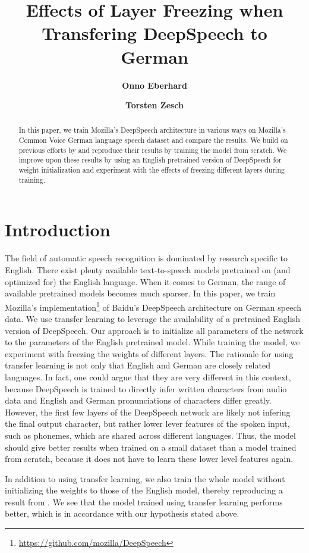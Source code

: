 \documentclass[12pt]{article}    %
\title{Effects of Layer Freezing when Transfering DeepSpeech to German}
\author[1]{\textbf{Onno Eberhard}}
\author[ ]{\textbf{Torsten Zesch}}
\affil[ ]{Language Technology Lab}
\affil[ ]{University of Duisburg-Essen}
\affil[1]{\href{mailto:onno.eberhard@stud.uni-due.de}{\texttt{onno.eberhard@stud.uni-due.de}}}
\date{}
\begin{document}
\maketitle

\begin{abstract}\noindent
In this paper, we train Mozilla's DeepSpeech architecture in various ways on Mozilla's Common Voice German language speech dataset and compare the results. We build on previous efforts by \textcite{agarwal-zesch-2019-german} and reproduce their results by training the model from scratch. We improve upon these results by using an English pretrained version of DeepSpeech for weight initialization and experiment with the effects of freezing different layers during training.
\end{abstract}

\section{Introduction}
The field of automatic speech recognition is dominated by research specific to English. There exist plenty available text-to-speech models pretrained on (and optimized for) the English language. When it comes to German, the range of available pretrained models becomes much sparser. In this paper, we train Mozilla's implementation\footnote{\url{https://github.com/mozilla/DeepSpeech}} of Baidu's DeepSpeech architecture \parencite{hannun2014deep} on German speech data. We use transfer learning to leverage the availability of a pretrained English version of DeepSpeech. Our approach is to initialize all parameters of the network to the parameters of the English pretrained model. While training the model, we experiment with freezing the weights of different layers. The rationale for using transfer learning is not only that English and German are closely related languages. In fact, one could argue that they are very different in this context, because DeepSpeech is trained to directly infer written characters from audio data and English and German pronunciations of characters differ greatly. However, the first few layers of the DeepSpeech network are likely not infering the final output character, but rather lower lever features of the spoken input, such as phonemes, which are shared across different languages. Thus, the model should give better results when trained on a small dataset than a model trained from scratch, because it does not have to learn these lower level features again.

In addition to using transfer learning, we also train the whole model without initializing the weights to those of the English model, thereby reproducing a result from \textcite{agarwal-zesch-2019-german}. We see that the model trained using transfer learning performs better, which is in accordance with our hypothesis stated above.
\end{document}
